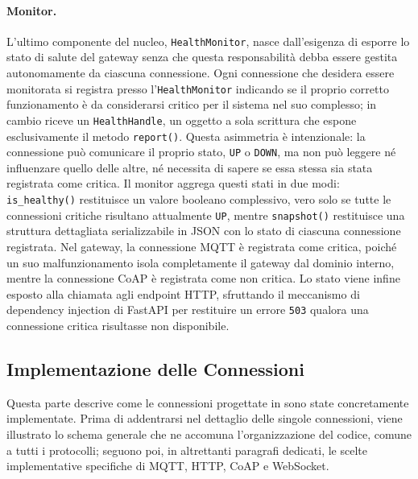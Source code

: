 \paragraph{Monitor.}
L'ultimo componente del nucleo, \texttt{HealthMonitor}, nasce dall'esigenza di esporre lo stato di salute del gateway senza che questa responsabilità debba essere gestita autonomamente da ciascuna connessione. Ogni connessione che desidera essere monitorata si registra presso l'\texttt{HealthMonitor} indicando se il proprio corretto funzionamento è da considerarsi critico per il sistema nel suo complesso; in cambio riceve un \texttt{HealthHandle}, un oggetto a sola scrittura che espone esclusivamente il metodo \texttt{report()}. Questa asimmetria è intenzionale: la connessione può comunicare il proprio stato, \texttt{UP} o \texttt{DOWN}, ma non può leggere né influenzare quello delle altre, né necessita di sapere se essa stessa sia stata registrata come critica. Il monitor aggrega questi stati in due modi: \texttt{is\_healthy()} restituisce un valore booleano complessivo, vero solo se tutte le connessioni critiche risultano attualmente \texttt{UP}, mentre \texttt{snapshot()} restituisce una struttura dettagliata serializzabile in JSON con lo stato di ciascuna connessione registrata. Nel gateway, la connessione \ac{MQTT} è registrata come critica, poiché un suo malfunzionamento isola completamente il gateway dal dominio interno, mentre la connessione \ac{CoAP} è registrata come non critica. Lo stato viene infine esposto alla chiamata agli endpoint \ac{HTTP}, sfruttando il meccanismo di dependency injection di FastAPI per restituire un errore \texttt{503} qualora una connessione critica risultasse non disponibile.
%
\subsection{Implementazione delle Connessioni}
\label{subsec:implementazione-delle-connessioni}
%
Questa parte descrive come le connessioni progettate in  sono state concretamente implementate. Prima di addentrarsi nel dettaglio delle singole connessioni, viene illustrato lo schema generale che ne accomuna l'organizzazione del codice, comune a tutti i protocolli; seguono poi, in altrettanti paragrafi dedicati, le scelte implementative specifiche di \ac{MQTT}, \ac{HTTP}, \ac{CoAP} e WebSocket.

